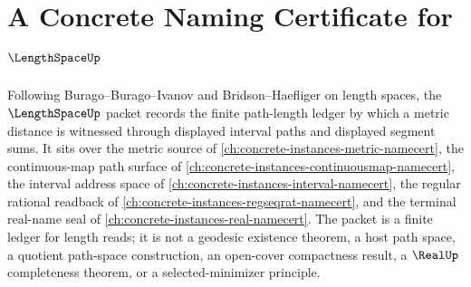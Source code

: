 \chapter{A Concrete Naming Certificate for $\LengthSpaceUp$}
\label{ch:concrete-instances-length-space-namecert}

Following Burago--Burago--Ivanov and Bridson--Haefliger on length spaces, the $\LengthSpaceUp$ packet records the finite path-length ledger by which a metric distance is witnessed through displayed interval paths and displayed segment sums. It sits over the metric source of \autoref{ch:concrete-instances-metric-namecert}, the continuous-map path surface of \autoref{ch:concrete-instances-continuousmap-namecert}, the interval address space of \autoref{ch:concrete-instances-interval-namecert}, the regular rational readback of \autoref{ch:concrete-instances-regseqrat-namecert}, and the terminal real-name seal of \autoref{ch:concrete-instances-real-namecert}. The packet is a finite ledger for length reads; it is not a geodesic existence theorem, a host path space, a quotient path-space construction, an open-cover compactness result, a $\RealUp$ completeness theorem, or a selected-minimizer principle.

